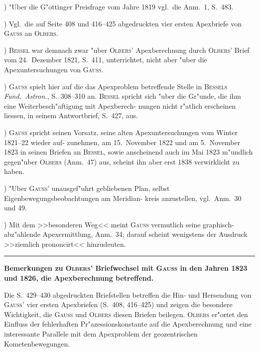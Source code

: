 \documentclass[12pt,a4paper]{article}
\theoremstyle{plain}
\theoremstyle{definition}
\theoremstyle{remark}
\begin{document}
\smallskip{}) "Uber die G"ottinger Preisfrage vom Jahre 1819 vgl.\ die Anm.~1, S.~483.

\smallskip{}) Vgl.\ die auf Seite 408 und 416--425 abgedruckten vier ersten Apexbriefe von \textsc{Gauss} an \textsc{Olbers}.

\smallskip{}) \textsc{Bessel} war demnach zwar "uber \textsc{Olbers}' Apexberechnung durch \textsc{Olbers}' Brief vom 24.~Dezember
1821, S.~411, unterrichtet, nicht aber "uber die Apexuntersuchungen von \textsc{Gauss}.

\smallskip{}) \textsc{Gauss} spielt hier auf die das Apexproblem betreffende Stelle in \textsc{Bessels} \textit{Fund.\ Astron.},
S.~308--310 an. \textsc{Bessel} spricht sich "uber die Gr"unde, die ihm eine Weiterbesch"aftigung mit Apexberech-
nungen nicht r"atlich erscheinen liessen, in seinem Antwortbrief, S.~427, aus.

\smallskip{}) \textsc{Gauss} spricht seinen Vorsatz, seine alten Apexuntersuchungen vom Winter 1821--22 wieder auf-
zunehmen, am 15.~November 1822 und am 5.~November 1823 in seinen Briefen an \textsc{Bessel}, sowie anscheinend
auch im Mai 1823 m"undlich gegen"uber \textsc{Olbers} (Anm.~47) aus, scheint ihn aber erst 1838 verwirklicht
zu haben.

\smallskip{}) "Uber \textsc{Gauss}' unausgef"uhrt gebliebenen Plan, selbst Eigenbewegungsbeobachtungen am Meridian-
kreis anzustellen, vgl.\ Anm.~30 und 49.

\smallskip{}) Mit dem >>besonderen Weg<< meint \textsc{Gauss} vermutlich seine graphisch-abz"ahlende Apexermittlung,
Anm.~34; darauf scheint wenigstens der Ausdruck >>ziemlich prononcirt<< hinzudeuten.

\vspace{0.5em}
\hrule
\vspace{0.5em}

\textbf{Bemerkungen zu \textsc{Olbers}' Briefwechsel mit \textsc{Gauss} in den Jahren 1823 und 1826,
die Apexberechnung betreffend.}

Die S.~429--430 abgedruckten Briefstellen betreffen die Hin- und Hersendung von \textsc{Gauss}' vier ersten
Apexbriefen (S.~408, 416--425) und zeigen die besondere Wichtigkeit, die \textsc{Gauss} und \textsc{Olbers} diesen
Briefen beilegen. \textsc{Olbers} er"ortet den Einfluss der fehlerhaften Pr"azessionskonstante auf die Apexberechnung
und eine interessante Parallele mit dem Apexproblem der geozentrischen Kometenbewegungen.
\end{document}
